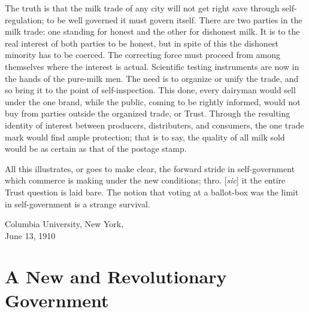 \documentclass[twoside,symmetric,nobib,justified]{tufte-book}
\let\oldchapter\chapter
\def\chapter{%
  \setcounter{footnote}{0}%
  \oldchapter
}
\begin{document}
\newpage The truth is that the milk trade of any city will not get right save
through self-regulation; to be well governed it must govern itself.
There are two parties in the milk trade: one standing for honest and the
other for dishonest milk. It is to the real interest of both par­ties to
be honest, but in spite of this the dishonest minority has to be
coerced. The correcting force must proceed from among themselves where
the interest is actual. Scientific testing instruments are now in the
hands of the pure-milk men. The need is to organize or unify the trade,
and so bring it to the point of self-inspection. This done, every
dairyman would sell under the one brand, while the public, coming to be
rightly informed, would not buy from parties outside the organ­ized
trade, or Trust. Through the resulting identity of interest be­tween
producers, distributers, and consumers, the one trade mark would find
ample protection; that is to say, the quality of all milk sold would be
as certain as that of the postage stamp.

All this illustrates, or goes to make clear, the forward stride in
self-government which commerce is making under the new conditions; thro.
{[}\emph{sic}{]} it the entire Trust question is laid bare. The notion
that voting at a ballot-box was the limit in self-government is a
strange survival.

\vspace{0.1in}

\hspace{2.5in}{\large Franklin Ford}

\vspace{0.1in}


\noindent Columbia University, New York,\\ June 13, 1910

\chapter[A New and Revolutionary Government]{A New and Revolutionary Government}
\label{ch:A New and Revolutionary Government}

\vspace{.2in}

\begin{LARGE}


\end{LARGE}
\end{document}
